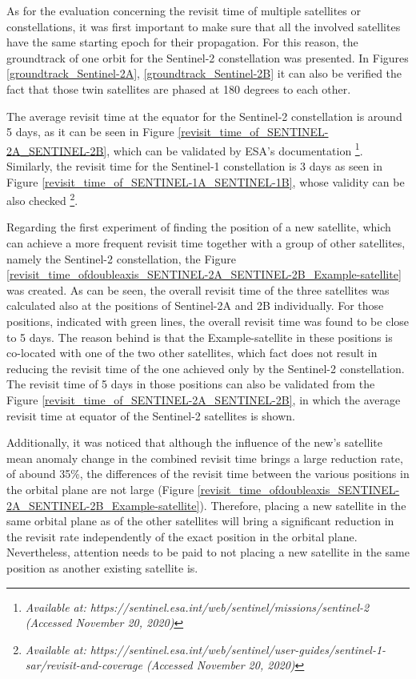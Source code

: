 \bigskip
As for the evaluation concerning the revisit time of multiple satellites or constellations, it was first important to make sure that all the involved satellites have the same starting epoch for their propagation. For this reason, the groundtrack of one orbit for the Sentinel-2 constellation was presented. In Figures \ref{groundtrack_Sentinel-2A}, 
\ref{groundtrack_Sentinel-2B} it can also be verified the fact that those twin satellites are phased at 180 degrees to each other.

The average revisit time at the equator for the Sentinel-2 constellation is around 5 days, as it can be seen in Figure \ref{revisit_time_of_SENTINEL-2A_SENTINEL-2B}, which can be validated by ESA's documentation \footnote{\label{Sentinel2_source}\textit{Available at: https://sentinel.esa.int/web/sentinel/missions/sentinel-2 (Accessed November 20, 2020)}}. Similarly, the revisit time for the Sentinel-1 constellation is 3 days as seen in Figure \ref{revisit_time_of_SENTINEL-1A_SENTINEL-1B}, whose validity can be also checked \footnote{\label{Sentinel1_source}\textit{Available at: https://sentinel.esa.int/web/sentinel/user-guides/sentinel-1-sar/revisit-and-coverage (Accessed November 20, 2020)}}.

\bigskip
Regarding the first experiment of finding the position of a new satellite, which can achieve a more frequent revisit time together with a group of other satellites, namely the Sentinel-2 constellation, the Figure \ref{revisit_time_ofdoubleaxis_SENTINEL-2A_SENTINEL-2B_Example-satellite} was created. As can be seen, the overall revisit time of the three satellites was calculated also at the positions of Sentinel-2A and 2B individually. For those positions, indicated with green lines, the overall revisit time was found to be close to 5 days. The reason behind is that the Example-satellite in these positions is co-located with one of the two other satellites, which fact does not result in reducing the revisit time of the one achieved only by the Sentinel-2 constellation. The revisit time of 5 days in those positions can also be validated from the Figure \ref{revisit_time_of_SENTINEL-2A_SENTINEL-2B}, in which the average revisit time at equator of the Sentinel-2 satellites is shown.

Additionally, it was noticed that although the influence of the new's satellite mean anomaly change in the combined revisit time brings a large reduction rate, of abound 35\%, the differences of the revisit time between the various positions in the orbital plane are not large (Figure \ref{revisit_time_ofdoubleaxis_SENTINEL-2A_SENTINEL-2B_Example-satellite}). Therefore, placing a new satellite in the same orbital plane as of the other satellites will bring a significant reduction in the revisit rate independently of the exact position in the orbital plane. Nevertheless, attention needs to be paid to not placing a new satellite in the same position as another existing satellite is.  

